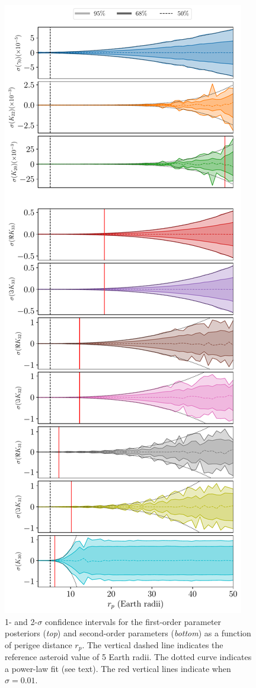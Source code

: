 \documentclass[fleqn,usenatbib]{mnras}
\begin{document}
\begin{figure}
  \centering
  \includegraphics[height=0.89\textheight]{figs/scan-perigee.pdf}
  \caption{1- and 2-$\sigma$ confidence intervals for the first-order parameter posteriors (\textit{top}) and second-order parameters (\textit{bottom}) as a function of perigee distance $r_p$. The vertical dashed line indicates the reference asteroid value of 5 Earth radii. The dotted curve indicates a power-law fit (see text). The red vertical lines indicate when $\sigma = 0.01$.}
  \label{fig:scan-perigee}
\end{figure}
\end{document}
